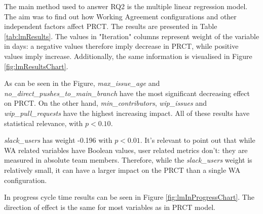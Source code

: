 The main method used to answer RQ2 is the multiple linear regression model. The aim was to find out how Working Agreement configurations and other independent factors affect PRCT. The results are presented in Table \ref{tab:lmResults}. The values in "Iteration" columns represent weight of the variable in days: a negative values therefore imply decrease in PRCT, while positive values imply increase. Additionally, the same information is visualised in Figure \ref{fig:lmResultsChart}. 

As can be seen in the Figure, \textit{max\_issue\_age} and \textit{no\_direct\_pushes\_to\_main\_branch} have the most significant decreasing effect on PRCT. On the other hand, \textit{min\issue\_contributors}, \textit{wip\_issues} and \textit{wip\_pull\_requests} have the highest increasing impact. All of these results have statistical relevance, with $ p < 0.10 $.

\textit{slack\_users} has weight -0.196 with $ p < 0.01 $. It's relevant to point out that while WA related variables have Boolean values, user related metrics don't: they are measured in absolute team members. Therefore, while the \textit{slack\_users} weight is relatively small, it can have a larger impact on the PRCT than a single WA configuration.





In progress cycle time results can be seen in Figure \ref{fig:lmInProgressChart}. The direction of effect is the same for most variables as in PRCT model. 


